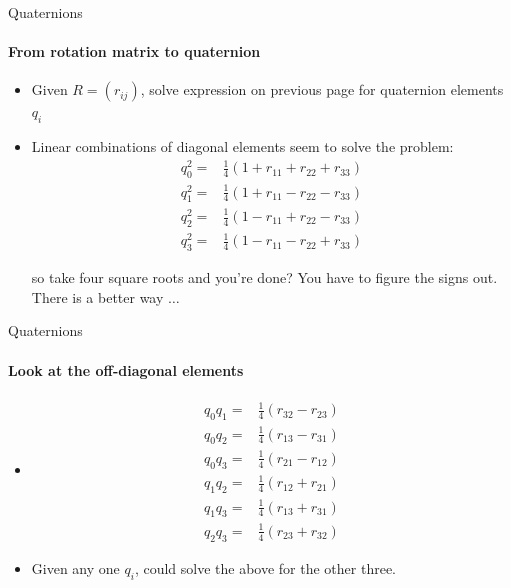 \documentclass[aspectratio=169]{beamer}
\begin{document}
\begin{frame}{Quaternions}
    \framesubtitle{From rotation matrix to quaternion}

    \begin{itemize}
        \item Given $R = (r_{ij})$, solve expression on previous page for
        quaternion elements $q_i$ 
        \item Linear combinations of diagonal elements seem to solve the problem:
        \begin{align*}
                q_0^2 =& \frac{1}{4} (1 + r_{11} + r_{22} + r_{33}) \\
                q_1^2 =& \frac{1}{4} (1 + r_{11} - r_{22} - r_{33}) \\
                q_2^2 =& \frac{1}{4} (1 - r_{11} + r_{22} - r_{33}) \\
                q_3^2 =& \frac{1}{4} (1 - r_{11} - r_{22} + r_{33})   
        \end{align*}
        
        so take four square roots and you're done?  You have to figure the
        signs out.  There is a better way $\ldots$
    \end{itemize}

\end{frame}

\begin{frame}{Quaternions}
    \framesubtitle{Look at the off-diagonal elements}
\begin{itemize}
    \item[]
    \begin{align*}
            q_0 q_1 =& \frac{1}{4}(r_{32} - r_{23}) \\
            q_0 q_2 =& \frac{1}{4}(r_{13} - r_{31}) \\
            q_0 q_3 =& \frac{1}{4}(r_{21} - r_{12}) \\
            q_1 q_2 =& \frac{1}{4}(r_{12} + r_{21}) \\
            q_1 q_3 =& \frac{1}{4}(r_{13} + r_{31}) \\
            q_2 q_3 =& \frac{1}{4}(r_{23} + r_{32})
    \end{align*}
    
    \item[]  Given any one $q_i$, could solve the above for the other three.
    \end{itemize}
\end{frame}


\end{document}
